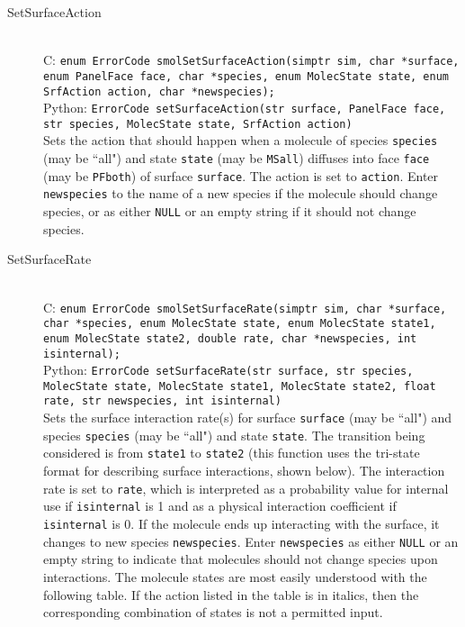 \documentclass {book}
\begin{document}
\begin{description}
\item[SetSurfaceAction]
\hfill \\
C: \texttt{enum ErrorCode smolSetSurfaceAction(simptr sim, char *surface, enum PanelFace face, char *species, enum MolecState state, enum SrfAction action, char *newspecies);}\\
Python: \texttt{ErrorCode setSurfaceAction(str surface, PanelFace face, str species, MolecState state, SrfAction action)}\\
Sets the action that should happen when a molecule of species \texttt{species} (may be ``all") and state \texttt{state} (may be \texttt{MSall}) diffuses into face \texttt{face} (may be \texttt{PFboth}) of surface \texttt{surface}. The action is set to \texttt{action}. Enter \texttt{newspecies} to the name of a new species if the molecule should change species, or as either \texttt{NULL} or an empty string if it should not change species.

\item[SetSurfaceRate]
\hfill \\
C: \texttt{enum ErrorCode smolSetSurfaceRate(simptr sim, char *surface, char *species, enum MolecState state, enum MolecState state1, enum MolecState state2, double rate, char *newspecies, int isinternal);}\\
Python: \texttt{ErrorCode setSurfaceRate(str surface, str species, MolecState state, MolecState state1, MolecState state2, float rate, str newspecies, int isinternal)}\\
Sets the surface interaction rate(s) for surface \texttt{surface} (may be ``all") and species \texttt{species} (may be ``all") and state \texttt{state}. The transition being considered is from \texttt{state1} to \texttt{state2} (this function uses the tri-state format for describing surface interactions, shown below). The interaction rate is set to \texttt{rate}, which is interpreted as a probability value for internal use if \texttt{isinternal} is 1 and as a physical interaction coefficient if \texttt{isinternal} is 0. If the molecule ends up interacting with the surface, it changes to new species \texttt{newspecies}. Enter \texttt{newspecies} as either \texttt{NULL} or an empty string to indicate that molecules should not change species upon interactions. The molecule states are most easily understood with the following table. If the action listed in the table is in italics, then the corresponding combination of states is not a permitted input.


\end{description}
\end{document}
